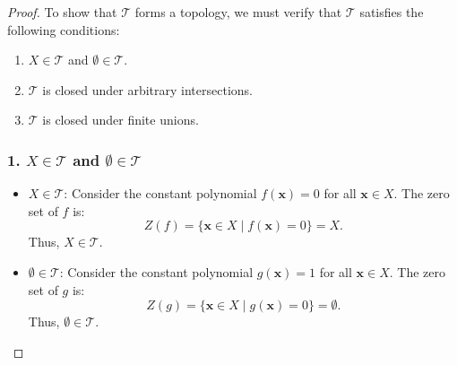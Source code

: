 \documentclass[11pt,openany]{article}
\begin{document}
\begin{proof}
	
To show that \( \mathcal{T} \) forms a topology, we must verify that \( \mathcal{T} \) satisfies the following conditions:

\begin{enumerate}
	\item \( X \in \mathcal{T} \) and \( \emptyset \in \mathcal{T} \).
	\item \( \mathcal{T} \) is closed under arbitrary intersections.
	\item \( \mathcal{T} \) is closed under finite unions.
\end{enumerate}

\subsubsection*{1. \( X \in \mathcal{T} \) and \( \emptyset \in \mathcal{T} \)}
\begin{itemize}
	\item[-] \textbf{\( X \in \mathcal{T} \)}: Consider the constant polynomial \( f(\mathbf{x}) = 0 \) for all \( \mathbf{x} \in X \). The zero set of \( f \) is: \[
	Z(f) = \{ \mathbf{x} \in X \mid f(\mathbf{x}) = 0 \} = X.
	\]
	Thus, \( X \in \mathcal{T} \).
	\item[-] \textbf{\( \emptyset \in \mathcal{T} \)}: Consider the constant polynomial \( g(\mathbf{x}) = 1 \) for all \( \mathbf{x} \in X \). The zero set of \( g \) is: \[
	Z(g) = \{ \mathbf{x} \in X \mid g(\mathbf{x}) = 0 \} = \emptyset.
	\]
	Thus, \( \emptyset \in \mathcal{T} \).
\end{itemize}


\end{proof}
\end{document}
